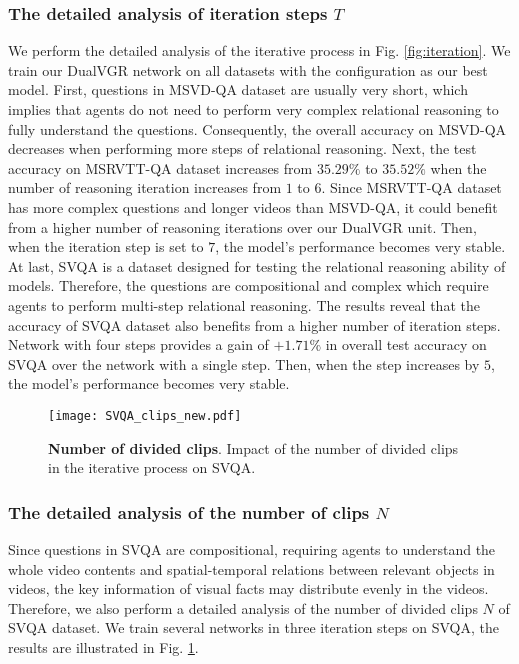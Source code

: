 \documentclass[journal]{IEEEtran}
\begin{document}
\subsubsection{The detailed analysis of iteration steps $T$}
We perform the detailed analysis of the iterative process in Fig. \ref{fig:iteration}. We train our DualVGR network on all datasets with the configuration as our best model. First, questions in MSVD-QA dataset are usually very short, which implies that agents do not need to perform very complex relational reasoning to fully understand the questions. Consequently, the overall accuracy on MSVD-QA decreases when performing more steps of relational reasoning. Next, the test accuracy on MSRVTT-QA dataset increases from $35.29\%$ to $35.52\%$ when the number of reasoning iteration increases from $1$ to $6$. Since MSRVTT-QA dataset has more complex questions and longer videos than MSVD-QA, it could benefit from a higher number of reasoning iterations over our DualVGR unit. Then, when the iteration step is set to $7$, the model's performance becomes very stable. At last, SVQA is a dataset designed for testing the relational reasoning ability of models. Therefore, the questions are compositional and complex which require agents to perform multi-step relational reasoning. The results reveal that the accuracy of SVQA dataset also benefits from a higher number of iteration steps. Network with four steps provides a gain of $+1.71\%$ in overall test accuracy on SVQA over the network with a single step. Then, when the step increases by $5$, the model's performance becomes very stable. 
\begin{figure}[t]
    \centering
    \texttt{[image: SVQA\_clips\_new.pdf]}
    \caption{\textbf{Number of divided clips}. Impact of the number of divided clips in the iterative process on SVQA.}
    \label{fig:SVQA_clip}
\end{figure}
\subsubsection{The detailed analysis of the number of clips $N$} 
Since questions in SVQA are compositional, requiring agents to understand the whole video contents and spatial-temporal relations between relevant objects in videos, the key information of visual facts may distribute evenly in the videos. Therefore, we also perform a detailed analysis of the number of divided clips $N$ of SVQA dataset. We train several networks in three iteration steps on SVQA, the results are illustrated in Fig. \ref{fig:SVQA_clip}.
\end{document}

